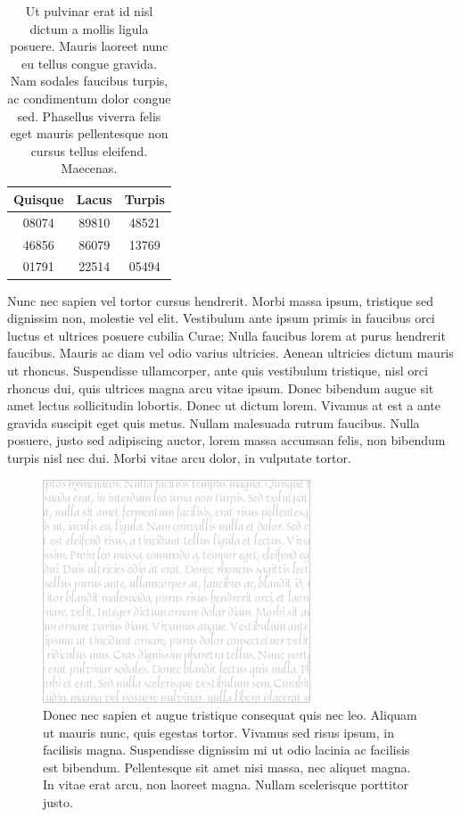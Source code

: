 \begin{table}[!t]
  \centering
  \begin{tabular}{ccc}
    \toprule
    Quisque & Lacus & Turpis\\
    \midrule
    08074 & 89810 & 48521\\
    46856 & 86079 & 13769\\
    01791 & 22514 & 05494\\
    \bottomrule
  \end{tabular}
  \caption[Ut pulvinar erat]{
    Ut pulvinar erat id nisl dictum a mollis ligula posuere.
Mauris laoreet nunc eu tellus congue gravida.
Nam sodales faucibus turpis, ac condimentum dolor congue sed.
Phasellus viverra felis eget mauris pellentesque non cursus tellus eleifend.
Maecenas.
  }
\end{table}

Nunc nec sapien vel tortor cursus hendrerit.
Morbi massa ipsum, tristique sed dignissim non, molestie vel elit.
Vestibulum ante ipsum primis in faucibus orci luctus et ultrices posuere cubilia Curae; Nulla faucibus lorem at purus hendrerit faucibus.
Mauris ac diam vel odio varius ultricies.
Aenean ultricies dictum mauris ut rhoncus.
Suspendisse ullamcorper, ante quis vestibulum tristique, nisl orci rhoncus dui, quis ultrices magna arcu vitae ipsum.
Donec bibendum augue sit amet lectus sollicitudin lobortis.
Donec ut dictum lorem.
Vivamus at est a ante gravida suscipit eget quis metus.
Nullam malesuada rutrum faucibus.
Nulla posuere, justo sed adipiscing auctor, lorem massa accumsan felis, non bibendum turpis nisl nec dui.
Morbi vitae arcu dolor, in vulputate tortor.

\begin{figure}[!t]
  \centering
  \includegraphics{figs/medium-rectangle-white}
  \caption[Donec nec sapien]{
    Donec nec sapien et augue tristique consequat quis nec leo.
Aliquam ut mauris nunc, quis egestas tortor.
Vivamus sed risus ipsum, in facilisis magna.
Suspendisse dignissim mi ut odio lacinia ac facilisis est bibendum.
Pellentesque sit amet nisi massa, nec aliquet magna.
In vitae erat arcu, non laoreet magna.
Nullam scelerisque porttitor justo.
  }
\end{figure}

